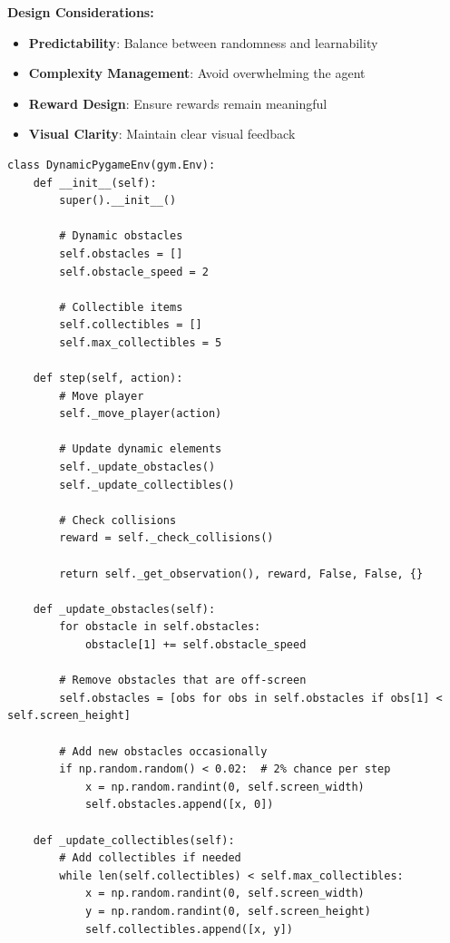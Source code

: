 \documentclass[12pt]{article}
\begin{document}
{{{\textbf{Design Considerations:}
\begin{itemize}
    \item \textbf{Predictability}: Balance between randomness and learnability
    \item \textbf{Complexity Management}: Avoid overwhelming the agent
    \item \textbf{Reward Design}: Ensure rewards remain meaningful
    \item \textbf{Visual Clarity}: Maintain clear visual feedback
\end{itemize}

\begin{verbatim}
class DynamicPygameEnv(gym.Env):
    def __init__(self):
        super().__init__()
        
        # Dynamic obstacles
        self.obstacles = []
        self.obstacle_speed = 2
        
        # Collectible items
        self.collectibles = []
        self.max_collectibles = 5
        
    def step(self, action):
        # Move player
        self._move_player(action)
        
        # Update dynamic elements
        self._update_obstacles()
        self._update_collectibles()
        
        # Check collisions
        reward = self._check_collisions()
        
        return self._get_observation(), reward, False, False, {}
        
    def _update_obstacles(self):
        for obstacle in self.obstacles:
            obstacle[1] += self.obstacle_speed
            
        # Remove obstacles that are off-screen
        self.obstacles = [obs for obs in self.obstacles if obs[1] < self.screen_height]
        
        # Add new obstacles occasionally
        if np.random.random() < 0.02:  # 2% chance per step
            x = np.random.randint(0, self.screen_width)
            self.obstacles.append([x, 0])
            
    def _update_collectibles(self):
        # Add collectibles if needed
        while len(self.collectibles) < self.max_collectibles:
            x = np.random.randint(0, self.screen_width)
            y = np.random.randint(0, self.screen_height)
            self.collectibles.append([x, y])
\end{verbatim}

}}}
\end{document}
